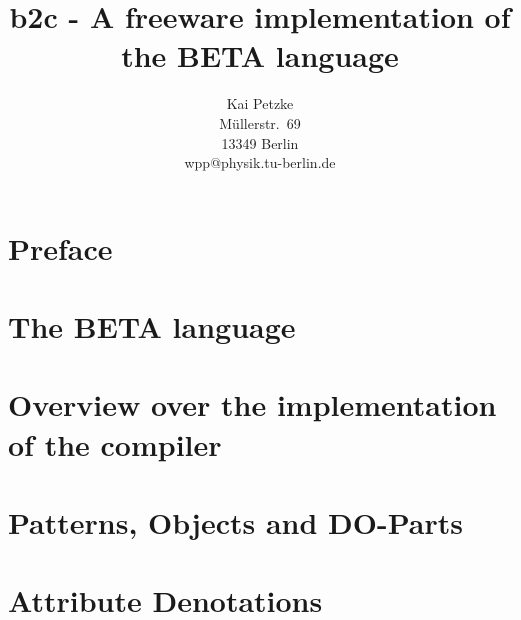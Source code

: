 

\title{b2c - A freeware implementation of the BETA language}
\author{Kai Petzke \\ M\"ullerstr.\ 69 \\ 13349 Berlin \\
        wpp@physik.tu-berlin.de}


\maketitle

\chapter*{Preface}


\chapter{The BETA language}


\chapter[Overview over the implementation]{Overview
over the implementation of the compiler}


\chapter{Patterns, Objects and DO-Parts}




\chapter{Attribute Denotations}





